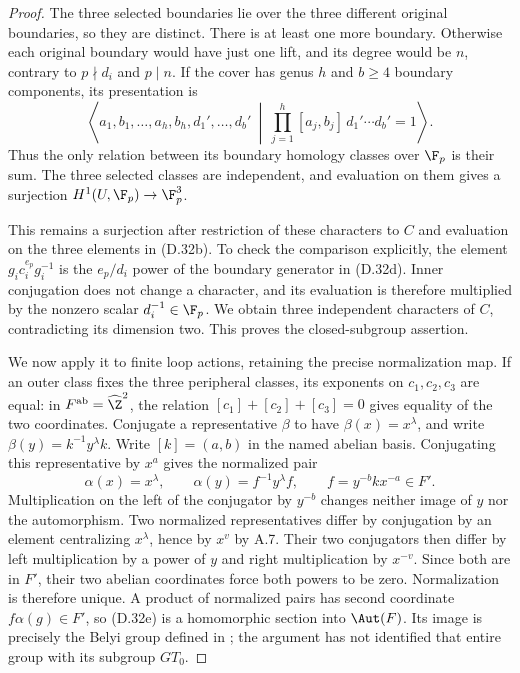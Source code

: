 \begin{proof}
The three selected boundaries lie over the three different original
boundaries, so they are distinct.  There is at least one more
boundary.  Otherwise each original boundary would have just one
lift, and its degree would be $n$, contrary to $p\nmid d_i$ and
$p\mid n$.  If the cover has genus $h$ and $b\geq4$ boundary
components, its presentation is
\[
 \left\langle a_1,b_1,\ldots,a_h,b_h,d_1',\ldots,d_b'
       \ \middle|\ \prod_{j=1}^h[a_j,b_j]\,
                         d_1'\cdots d_b'=1\right\rangle.
\]
Thus the only relation between its boundary homology classes over
$\F_p$ is their sum.  The three selected classes are independent,
and evaluation on them gives a surjection
$H^1(U,\F_p)\to\F_p^3$.

This remains a surjection after restriction of these characters to
$C$ and evaluation on the three elements in (D.32b).
To check the comparison explicitly, the element
$g_i c_i^{e_p}g_i^{-1}$ is the $e_p/d_i$ power of the boundary
generator in (D.32d).  Inner conjugation does not change a
character, and its evaluation is therefore multiplied by the
nonzero scalar $d_i^{-1}\in\F_p$.  We obtain three independent
characters of $C$, contradicting its dimension two.  This proves
the closed-subgroup assertion.

We now apply it to finite loop actions, retaining the precise
normalization map.  If an outer class fixes the three peripheral
classes, its exponents on $c_1,c_2,c_3$ are equal: in
$F^{\rm ab}=\widehat\Z^2$, the relation
$[c_1]+[c_2]+[c_3]=0$ gives equality of the two coordinates.
Conjugate a representative $\beta$ to have
$\beta(x)=x^\lambda$, and write
$\beta(y)=k^{-1}y^\lambda k$.  Write $[k]=(a,b)$ in the
named abelian basis.  Conjugating this representative by $x^a$
gives the normalized pair
\[
 \alpha(x)=x^\lambda,\qquad
 \alpha(y)=f^{-1}y^\lambda f,
       \qquad f=y^{-b}kx^{-a}\in F'.                     \tag{D.32e}
\]
Multiplication on the left of the conjugator by $y^{-b}$ changes
neither image of $y$ nor the automorphism.  Two normalized
representatives differ by conjugation by an element centralizing
$x^\lambda$, hence by $x^v$ by A.7.  Their two conjugators then
differ by left multiplication by a power of $y$ and right
multiplication by $x^{-v}$.  Since both are in $F'$, their two
abelian coordinates force both powers to be zero.  Normalization
is therefore unique.  A product of normalized pairs has second
coordinate $f\alpha(g)\in F'$, so (D.32e) is a homomorphic
section into $\Aut(F)$.  Its image is precisely the Belyi group
defined in \cite[p.~3120, equation (2)]{R-HS}; the argument has
not identified that entire group with its subgroup $GT_0$.


\end{proof}
